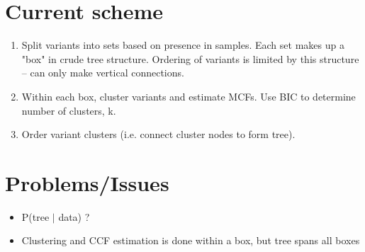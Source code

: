 \documentclass{article}
\begin{document}
	
	\section{Current scheme}
	
	\begin{enumerate}
		\item Split variants into sets based on presence in samples. Each set makes up a "box" in crude tree structure. Ordering of variants is limited by this structure -- can only make vertical connections.
		\item Within each box, cluster variants and estimate MCFs. Use BIC to determine number of clusters, k. 
		\item Order variant clusters (i.e. connect cluster nodes to form tree). 
	\end{enumerate}
	
	\section{Problems/Issues}
	
	\begin{itemize}
		\item P(tree $|$ data) ?
		\item Clustering and CCF estimation is done within a box, but tree spans all boxes 
		
		
	\end{itemize}
	
\end{document}
